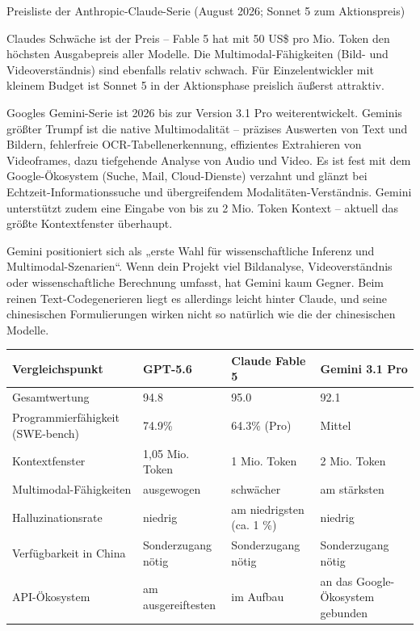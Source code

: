 \begin{center}\small\color{gray}Preisliste der Anthropic-Claude-Serie (August 2026; Sonnet 5 zum Aktionspreis)\end{center}

Claudes Schwäche ist der Preis – Fable 5 hat mit 50 US\$ pro Mio. Token den höchsten Ausgabepreis aller Modelle. Die Multimodal-Fähigkeiten (Bild- und Videoverständnis) sind ebenfalls relativ schwach. Für Einzelentwickler mit kleinem Budget ist Sonnet 5 in der Aktionsphase preislich äußerst attraktiv.


Googles Gemini-Serie ist 2026 bis zur Version 3.1 Pro weiterentwickelt. Geminis größter Trumpf ist die native Multimodalität – präzises Auswerten von Text und Bildern, fehlerfreie OCR-Tabellenerkennung, effizientes Extrahieren von Videoframes, dazu tiefgehende Analyse von Audio und Video. Es ist fest mit dem Google-Ökosystem (Suche, Mail, Cloud-Dienste) verzahnt und glänzt bei Echtzeit-Informationssuche und übergreifendem Modalitäten-Verständnis. Gemini unterstützt zudem eine Eingabe von bis zu 2 Mio. Token Kontext – aktuell das größte Kontextfenster überhaupt.

Gemini positioniert sich als „erste Wahl für wissenschaftliche Inferenz und Multimodal-Szenarien“. Wenn dein Projekt viel Bildanalyse, Videoverständnis oder wissenschaftliche Berechnung umfasst, hat Gemini kaum Gegner. Beim reinen Text-Codegenerieren liegt es allerdings leicht hinter Claude, und seine chinesischen Formulierungen wirken nicht so natürlich wie die der chinesischen Modelle.

\begin{center}
\begin{tabularx}{\linewidth}{|X|X|X|X|}
\hline
\textbf{Vergleichspunkt} & \textbf{GPT-5.6} & \textbf{Claude Fable 5} & \textbf{Gemini 3.1 Pro} \tabularnewline
\hline
Gesamtwertung & 94.8 & 95.0 & 92.1 \tabularnewline
Programmierfähigkeit (SWE-bench) & 74.9\% & 64.3\% (Pro) & Mittel \tabularnewline
Kontextfenster & 1,05 Mio. Token & 1 Mio. Token & 2 Mio. Token \tabularnewline
Multimodal-Fähigkeiten & ausgewogen & schwächer & am stärksten \tabularnewline
Halluzinationsrate & niedrig & am niedrigsten (ca. 1 \%) & niedrig \tabularnewline
Verfügbarkeit in China & Sonderzugang nötig & Sonderzugang nötig & Sonderzugang nötig \tabularnewline
API-Ökosystem & am ausgereiftesten & im Aufbau & an das Google-Ökosystem gebunden \tabularnewline
\hline
\end{tabularx}
\end{center}

